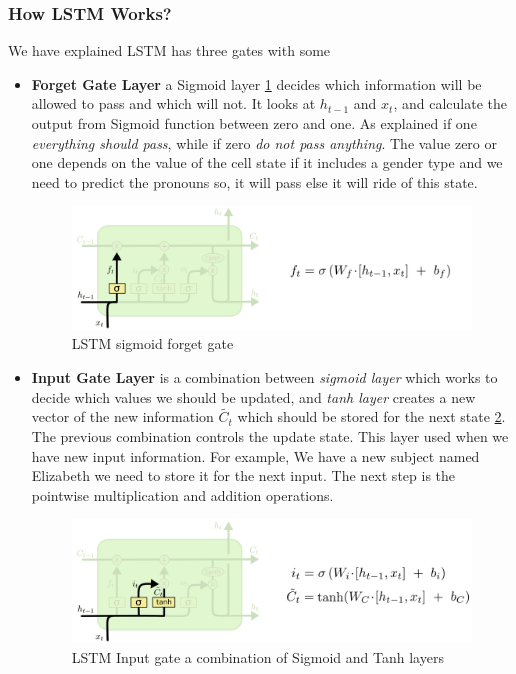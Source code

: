 \newpage
\subsubsection{How LSTM Works?}

We have explained LSTM has three gates with some 

\begin{itemize}
  
\item \textbf{Forget Gate Layer} a Sigmoid layer \ref{fig:LSTM-forget-gate} decides which information will be allowed to pass and which will not. It looks at $h_{t-1}$ and $x_t$, and calculate the output from Sigmoid function between zero and one. As explained if one \textit{everything should pass}, while if zero \textit{do not pass anything}. The value zero or one depends on the value of the cell state if it includes a gender type and we need to predict the pronouns so, it will pass else it will ride of this state.

\begin{figure}[h!]
    \centering
        \includegraphics[width=\textwidth]{./Figures/Ch_2_Background/LSTM-forget-gate.png}
        \caption{LSTM sigmoid forget gate \cite{colah}}
        \label{fig:LSTM-forget-gate}
\end{figure}



\item \textbf{Input Gate Layer} is a combination between \textit{sigmoid layer} which works to decide which values we should be updated, and \textit{tanh layer} creates a new vector of the new information $\tilde{C_t}$ which should be stored for the next state \ref{fig:LSTM-input-gate}. The previous combination controls the update state. This layer used when we have new input information. For example, We have a new subject named Elizabeth we need to store it for the next input. The next step is the pointwise multiplication and addition operations.

\begin{figure}[h!]
    \centering
        \includegraphics[width=\textwidth]{./Figures/Ch_2_Background/LSTM-input-gate.png}
        \caption{LSTM Input gate a combination of Sigmoid and Tanh layers \cite{colah}}
        \label{fig:LSTM-input-gate}
\end{figure}


\end{itemize}

